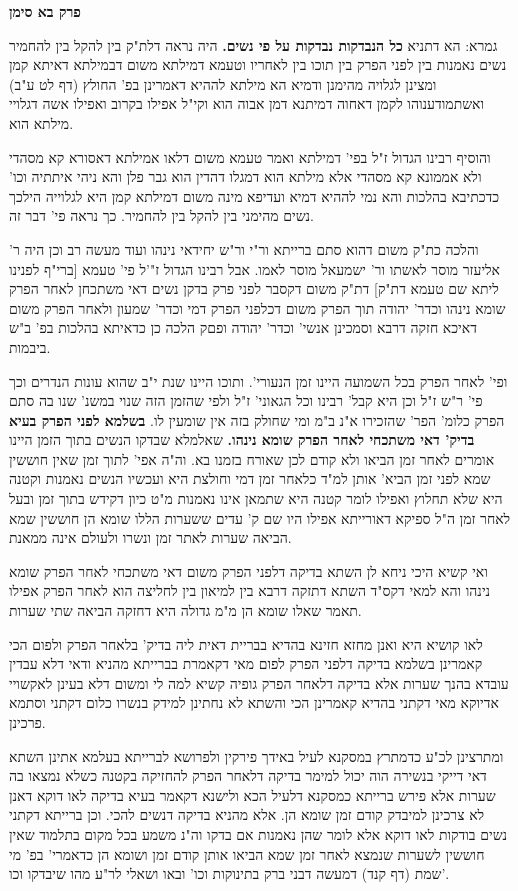 \documentclass[12pt, openany]{book}
\newcommand{\sethebfont}{
\fontsize{10.5pt}{21.0pt} \selectfont
}
\newcommand{\twocol}[1]{
	{\sethebfont \begin{multicols}{2}
			#1
	\end{multicols}}	
}
\newcommand{\chapname}{}
\newcommand{\newchap}[1]{
	\addcontentsline{toc}{chapter}{#1}
	\renewcommand{\chapname}{#1}
		\begin{center}
			\textbf{%
\fontsize{16pt}{16pt}\selectfont
				#1}
		\end{center}
}
\begin{document}
{\newchap{פרק  בא סימן}
\twocol{גמרא: הא דתניא \textbf{כל הנבדקות נבדקות על פי נשים.} היה נראה דלת"ק בין להקל בין להחמיר נשים נאמנות בין לפני הפרק בין תוכו בין לאחריו וטעמא דמילתא משום דבמילתא דאיתא קמן ומצינן לגלויה מהימנן ודמיא הא מילתא לההיא דאמרינן בפ' החולץ (דף לט ע"ב) ואשתמודענוהו לקמן דאחוה דמיתנא דמן אבוה הוא וקי"ל אפילו בקרוב ואפילו אשה דגלויי מילתא הוא.\par והוסיף רבינו הגדול ז"ל בפי' דמילתא ואמר טעמא משום דלאו אמילתא דאסורא קא מסהדי ולא אממונא קא מסהדי אלא מילתא הוא דמגלו דהדין הוא גבר פלן והא ניהי איתתיה וכו' כדכתיבא בהלכות והא נמי לההיא דמיא ועדיפא מינה משום דמילתא קמן היא לגלוייה הילכך נשים מהימני בין להקל בין להחמיר. כך נראה פי' דבר זה.\par והלכה כת"ק משום דהוא סתם ברייתא ור"י ור"ש יחידאי נינהו ועוד מעשה רב וכן היה ר' אליעזר מוסר לאשתו ור' ישמעאל מוסר לאמו. אבל רבינו הגדול ז"'ל פי' טעמא {\small [ברי"ף לפנינו ליתא שם טעמא דת"ק]} דת"ק משום דקסבר לפני פרק בדקן נשים דאי משתכחן לאחר הפרק שומא נינהו וכדר' יהודה תוך הפרק משום דכלפני הפרק דמי וכדר' שמעון ולאחר הפרק משום דאיכא חזקה דרבא וסמכינן אנשי' וכדר' יהודה ופםק הלכה כן כדאיתא בהלכות בפ' ב"ש ביבמות.\par ופי' לאחר הפרק בכל השמועה היינו זמן הנעורי'. ותוכו היינו שנת י"ב שהוא עונות הנדרים וכך פי' ר"ש ז"ל וכן היא קבל' רבינו וכל הגאוני' ז"ל ולפי שהזמן הזה שנוי במשנ' שנו בה סתם הפרק כלומ' הפר' שהזכירו א"נ ב"מ ומי שחולק בזה אין שומעין לו. 
\textbf{בשלמא לפני הפרק בעיא בדיק' דאי משתכחי לאחר הפרק שומא נינהו.} שאלמלא שבדקו הנשים בתוך הזמן היינו אומרים לאחר זמן הביאו ולא קודם לכן שאורח בזמנו בא. וה"ה אפי' לתוך זמן שאין חוששין שמא לפני זמן הביא' אותן למ"ד כלאחר זמן דמי וחולצת היא ועכשיו הנשים נאמנות וקטנה היא שלא תחלוץ ואפילו לומר קטנה היא שתמאן אינו נאמנות מ"ט כיון דקידש בתוך זמן ובעל לאחר זמן ה"ל ספיקא דאורייתא אפילו היו שם ק' עדים ששערות הללו שומא הן חוששין שמא הביאה שערות לאתר זמן ונשרו ולעולם אינה ממאנת.\par ואי קשיא היכי ניחא לן השתא בדיקה דלפני הפרק משום דאי משתכחי לאחר הפרק שומא נינהו והא למאי דקס"ד השתא דתזקה דרבא בין למיאון בין לחליצה הוא לאחר הפרק אפילו תאמר שאלו שומא הן מ"מ גדולה היא דחזקה הביאה שתי שערות.\par לאו קושיא היא ואנן מחזא חזינא בהדיא בבריית דאית ליה בדיק' בלאחר הפרק ולפום הכי קאמרינן בשלמא בדיקה דלפני הפרק לפום מאי דקאמרת בברייתא מהניא ודאי דלא עבדין עובדא בהנך שערות אלא בדיקה דלאחר הפרק גופיה קשיא למה לי ומשום דלא בעינן לאקשויי אדיוקא מאי דקתני בהדיא קאמרינן הכי והשתא לא נחתינן למידק בנשרו כלום דקתני וסתמא פרכינן.\par ומתרצינן לכ"ע כדמתרץ במסקנא לעיל באידך פירקין ולפרושא לברייתא בעלמא אתינן השתא דאי דייקי בנשירה הוה יכול למימר בדיקה דלאחר הפרק להחזיקה בקטנה כשלא נמצאו בה שערות אלא פירש ברייתא כמסקנא דלעיל הכא ולישנא דקאמר בעיא בדיקה לאו דוקא דאנן לא צרכינן למיבדק קודם זמן שומא הן. אלא מהניא בדיקה דנשים להכי. וכן ברייתא דקתני נשים בודקות לאו דוקא אלא לומר שהן נאמנות אם בדקו וה"נ משמע בכל מקום בתלמוד שאין חוששין לשערות שנמצא לאחר זמן שמא הביאו אותן קודם זמן ושומא הן כדאמרי' בפ' מי שמת (דף קנד) דמעשה דבני ברק בתינוקות וכו' ובאו ושאלי לר"ע מהו שיבדקו וכו'. 
}}
\end{document}
